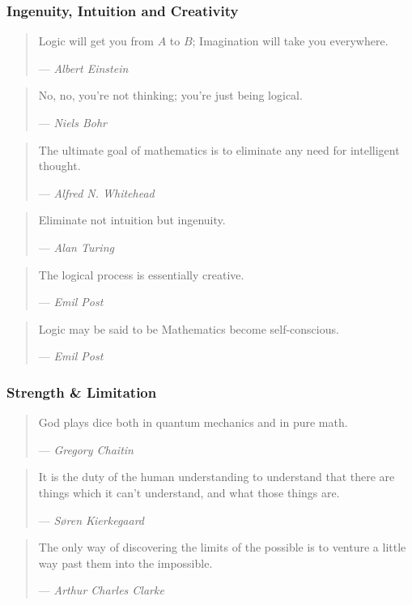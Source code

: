 \documentclass[UTF8,aspectratio=43,11pt,colorlinks,compress,openany]{beamer}%
\begin{document}
\begin{frame}\frametitle{Ingenuity, Intuition and Creativity}
	\begin{quote}
		Logic will get you from $A$ to $B$; Imagination will take you everywhere. \par
		\hfill --- \textsl{Albert Einstein}
	\end{quote}
	\begin{quote}
		No, no, you're not thinking; you're just being logical. \par
		\hfill --- \textsl{Niels Bohr}
	\end{quote}
	\begin{quote}
		The ultimate goal of mathematics is to eliminate any need for intelligent thought.\par
		\hfill --- \textsl{Alfred N. Whitehead}
	\end{quote}
	\begin{quote}
		Eliminate not intuition but ingenuity.\par
		\hfill --- \textsl{Alan Turing}
	\end{quote}
	\begin{quote}
		The logical process is essentially creative.\par
		\hfill --- \textsl{Emil Post}
	\end{quote}
	\begin{quote}
		Logic may be said to be Mathematics become
		self-conscious.\par
		\hfill --- \textsl{Emil Post}
	\end{quote}
\end{frame}

\begin{frame}\frametitle{Strength \& Limitation}
	\begin{quote}
		God plays dice both in quantum mechanics and in pure math. \par
		\hfill --- \textsl{Gregory Chaitin}
	\end{quote}
	\begin{quote}
		It is the duty of the human understanding to understand that there are things which it can't understand, and what those things are.\par
		\hfill --- \textsl{S{\o}ren Kierkegaard}
	\end{quote}
	\begin{quote}
		The only way of discovering the limits of the possible is to venture a little way past them into the impossible. \par
		\hfill --- \textsl{Arthur Charles Clarke}
	\end{quote}
\end{frame}
\end{document}
